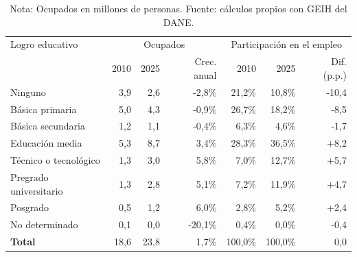 \begin{table}[H]
\centering
\caption{Logro educativo de la población ocupada, 2010 y 2025}
\label{tab:remuneracion_educacion_comparable}
\scriptsize
\begin{tabular}{@{}p{4.0cm}rrrrrr@{}}
\toprule
Logro educativo & \multicolumn{3}{c}{Ocupados} & \multicolumn{3}{c}{Participación en el empleo} \\
 & 2010 & 2025 & Crec. anual & 2010 & 2025 & Dif. (p.p.) \\
\midrule
Ninguno & 3,9 & 2,6 & -2,8\% & 21,2\% & 10,8\% & -10,4 \\
Básica primaria & 5,0 & 4,3 & -0,9\% & 26,7\% & 18,2\% & -8,5 \\
Básica secundaria & 1,2 & 1,1 & -0,4\% & 6,3\% & 4,6\% & -1,7 \\
Educación media & 5,3 & 8,7 & 3,4\% & 28,3\% & 36,5\% & +8,2 \\
Técnico o tecnológico & 1,3 & 3,0 & 5,8\% & 7,0\% & 12,7\% & +5,7 \\
Pregrado universitario & 1,3 & 2,8 & 5,1\% & 7,2\% & 11,9\% & +4,7 \\
Posgrado & 0,5 & 1,2 & 6,0\% & 2,8\% & 5,2\% & +2,4 \\
No determinado & 0,1 & 0,0 & -20,1\% & 0,4\% & 0,0\% & -0,4 \\
\midrule
\textbf{Total} & 18,6 & 23,8 & 1,7\% & 100,0\% & 100,0\% & 0,0 \\
\bottomrule
\end{tabular}
\caption*{\footnotesize Nota: Ocupados en millones de personas. %
Fuente: cálculos propios con GEIH del DANE.}
\end{table}
